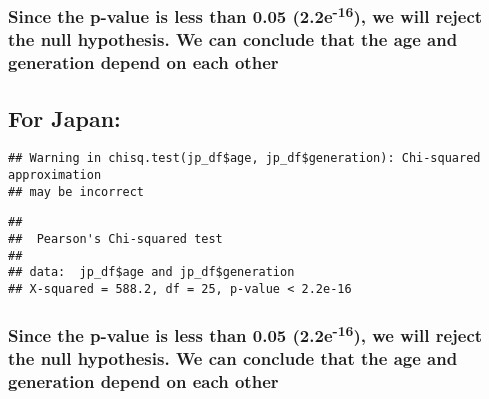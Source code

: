 \documentclass[
]{article}
\newenvironment{Shaded}{\begin{snugshade}}{\end{snugshade}}
\newcommand{\FunctionTok}[1]{\textcolor[rgb]{0.00,0.00,0.00}{#1}}
\newcommand{\NormalTok}[1]{#1}
\newcommand{\SpecialCharTok}[1]{\textcolor[rgb]{0.00,0.00,0.00}{#1}}
\begin{document}
\hypertarget{since-the-p-value-is-less-than-0.05-2.2e-16-we-will-reject-the-null-hypothesis.-we-can-conclude-that-the-age-and-generation-depend-on-each-other-2}{%
\subsubsection{\texorpdfstring{Since the p-value is less than 0.05
(2.2e\textsuperscript{-16}), we will reject the null hypothesis. We can
conclude that the age and generation depend on each
other}{Since the p-value is less than 0.05 (2.2e-16), we will reject the null hypothesis. We can conclude that the age and generation depend on each other}}\label{since-the-p-value-is-less-than-0.05-2.2e-16-we-will-reject-the-null-hypothesis.-we-can-conclude-that-the-age-and-generation-depend-on-each-other-2}}

\hypertarget{for-japan-1}{%
\subsection{For Japan:}\label{for-japan-1}}

\begin{Shaded}
\end{Shaded}

\begin{verbatim}
## Warning in chisq.test(jp_df$age, jp_df$generation): Chi-squared approximation
## may be incorrect
\end{verbatim}

\begin{verbatim}
## 
##  Pearson's Chi-squared test
## 
## data:  jp_df$age and jp_df$generation
## X-squared = 588.2, df = 25, p-value < 2.2e-16
\end{verbatim}

\hypertarget{since-the-p-value-is-less-than-0.05-2.2e-16-we-will-reject-the-null-hypothesis.-we-can-conclude-that-the-age-and-generation-depend-on-each-other-3}{%
\subsubsection{\texorpdfstring{Since the p-value is less than 0.05
(2.2e\textsuperscript{-16}), we will reject the null hypothesis. We can
conclude that the age and generation depend on each
other}{Since the p-value is less than 0.05 (2.2e-16), we will reject the null hypothesis. We can conclude that the age and generation depend on each other}}\label{since-the-p-value-is-less-than-0.05-2.2e-16-we-will-reject-the-null-hypothesis.-we-can-conclude-that-the-age-and-generation-depend-on-each-other-3}}
\end{document}
